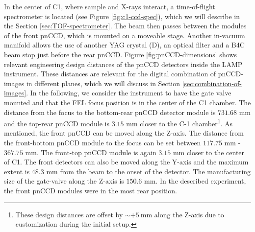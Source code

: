 In the center of C1, where sample and X-rays interact, a time-of-flight spectrometer is located (see Figure \ref{fig:c1-ccd-spec}), which we will describe in the Section \ref{sec:TOF-spectrometer}. The beam then passes between the modules of the front pnCCD, which is mounted on a moveable stage. Another in-vacuum manifold allows the use of another YAG crystal (D), an optical filter and a B4C beam stop just before the rear pnCCD. Figure \ref{fig:pnCCD-dimensions} shows relevant engineering design distances of the pnCCD detectors inside the LAMP instrument. These distances are relevant for the digital combination of pnCCD-images in different planes, which we will discuss in Section \ref{sec:combination-of-images}. In the following, we consider the instrument to have the gate valve mounted and that the FEL focus position is in the center of the C1 chamber. The distance from the focus to the bottom-rear pnCCD detector module is $731.68$ mm and the top-rear pnCCD module is $3.15$ mm closer to the C-1 chamber\footnote{These design distances are offset by $\sim +\SI{5}{\milli\meter}$ along the Z-axis due to customization during the initial setup.}. As mentioned, the front pnCCD can be moved along the Z-axis. The distance from the front-bottom pnCCD module to the focus can be set between $117.75$ mm - $367.75$ mm. The front-top pnCCD module is again $3.15$ mm closer to the center of C1. The front detectors can also be moved along the Y-axis and the maximum extent is $48.3$ mm from the beam to the onset of the detector. The manufacturing size of the gate-valve along the Z-axis is $150.6$ mm. In the described experiment, the front pnCCD modules were in the most rear position.\\
%
%
%
